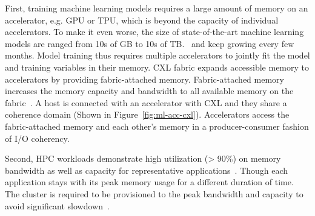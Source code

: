 First, training machine learning models requires a large amount of memory on an accelerator, e.g. GPU or TPU, which is beyond the capacity of individual accelerators.
%
To make it even worse, the size of state-of-the-art machine learning models are ranged from 10s of GB to 10s of TB.~\cite{zero:arxiv:2020, zero-infinity:sc:2021, zionex:isca:2022} and keep growing every few months.
%
Model training thus requires multiple accelerators to jointly fit the model and training variables in their memory. 
%
%
CXL fabric expands accessible memory to accelerators by providing fabric-attached memory.
%
Fabric-attached memory increases the memory capacity and bandwidth to all available memory on the fabric~\cite{cxl-3-0-spec, samsung-memory-expander:hcs:2022, memory-scalability:microchip}.
%
%
A host is connected with an accelerator with CXL and they share a coherence domain (Shown in Figure~\ref{fig:ml-acc-cxl}).   
%
Accelerators access the fabric-attached memory and each other's memory in a producer-consumer fashion of I/O coherency.
%
%

Second, HPC workloads demonstrate high utilization (> 90\%) on memory bandwidth as well as capacity for representative applications~\cite{doe-miniapps, crossroad-benchmarks, exascale-apps}. 
%
Though each application stays with its peak memory usage for a different duration of time.
%
The cluster is required to be provisioned to the peak bandwidth and capacity to avoid significant slowdown~\cite{hpc-memory-requirement:upc:2019, memory-trend:snl:2020, hpc-disagg-mem:arxiv:2023}.
%
%

